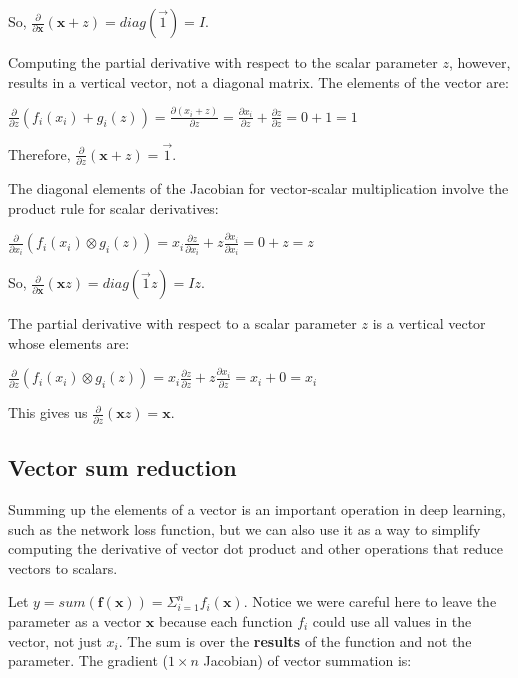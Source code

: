 \documentclass[11pt]{article}
\begin{document}
So, $\frac{\partial}{\partial \mathbf{x}} ( \mathbf{x} + z ) = diag(\vec{1}) = I$.

Computing the partial derivative with respect to the scalar parameter $z$, however, results in a vertical vector, not a diagonal matrix. The elements of the vector are:
 
$\frac{\partial}{\partial z} ( f_i(x_i) + g_i(z) ) = \frac{\partial (x_i + z)}{\partial z} = \frac{\partial x_i}{\partial z} + \frac{\partial z}{\partial z} = 0 + 1 = 1$

Therefore, $\frac{\partial}{\partial z} ( \mathbf{x} + z ) = \vec{1}$.

The diagonal elements of the Jacobian for vector-scalar multiplication involve the product rule for scalar derivatives:

$\frac{\partial}{\partial x_i} ( f_i(x_i) \otimes g_i(z) ) = x_i  \frac{\partial z}{\partial x_i} + z  \frac{\partial x_i}{\partial x_i} = 0 + z = z$

So, $\frac{\partial}{\partial \mathbf{x}} ( \mathbf{x} z ) = diag(\vec{1}  z) = I z$. 

The partial derivative with respect to a scalar parameter $z$ is a vertical vector whose elements are:

$\frac{\partial}{\partial z} ( f_i(x_i) \otimes g_i(z) ) = x_i \frac{\partial z}{\partial z} + z \frac{\partial x_i}{\partial z} = x_i + 0 = x_i$

This gives us $\frac{\partial}{\partial z} ( \mathbf{x} z ) = \mathbf{x}$.

\subsection{Vector sum reduction}

Summing up the elements of a vector is an important operation in deep learning, such as the network loss function, but we can also use it as a way to simplify computing the derivative of vector dot product and other operations that reduce vectors to scalars.

Let $y = sum( \mathbf{f}(\mathbf{x})) = \Sigma_{i=1}^n f_i(\mathbf{x})$.  Notice we were careful here to leave the parameter as a vector $\mathbf{x}$ because each function $f_i$ could use all values in the vector, not just $x_i$. The sum is over the {\bf results} of the function and not the parameter. The gradient ($1 \times n$ Jacobian) of vector summation is:
\end{document}
